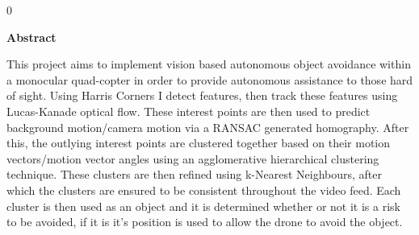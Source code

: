 0\thispagestyle{empty}

\begin{center}
    {\LARGE\bf Abstract}
\end{center}
This project aims to implement vision based autonomous object avoidance within a monocular quad-copter in order to provide autonomous assistance to those hard of sight. Using Harris Corners  I detect features, then track these features using Lucas-Kanade optical flow. These interest points are then used to predict background motion/camera motion via a RANSAC generated homography. After this, the outlying interest points are clustered together based on their motion vectors/motion vector angles using an agglomerative hierarchical clustering technique. These clusters are then refined using k-Nearest Neighbours, after which the clusters are ensured to be consistent throughout the video feed. Each cluster is then used as an object and it is determined whether or not it is a risk to be avoided, if it is it's position is used to allow the drone to avoid the object.